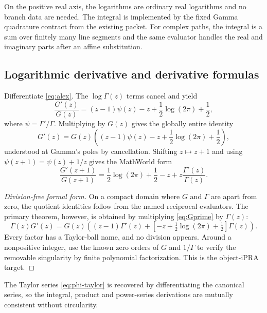 On the positive real axis, the logarithms are ordinary real logarithms and no
branch data are needed.  The integral is implemented by the fixed Gamma
quadrature contract from the existing packet.  For complex paths, the integral
is a sum over finitely many line segments and the same evaluator handles the
real and imaginary parts after an affine substitution.

\subsection{Logarithmic derivative and derivative formulas}

Differentiate \cref{eq:alex}.  The \(\log\Gamma(z)\) terms cancel and yield
\begin{equation}\label{eq:phi-global}
 \frac{G'(z)}{G(z)}
 =(z-1)\psi(z)-z+\frac12\log(2\pi)+\frac12,
\end{equation}
where \(\psi=\Gamma'/\Gamma\).  Multiplying by \(G(z)\) gives the globally
entire identity
\begin{equation}\label{eq:Gprime}
 G'(z)=G(z)\left((z-1)\psi(z)-z+\frac12\log(2\pi)+\frac12\right),
\end{equation}
understood at Gamma's poles by cancellation.  Shifting \(z\mapsto z+1\) and
using \(\psi(z+1)=\psi(z)+1/z\) gives the MathWorld form
\begin{equation}\label{eq:phi-shift}
 \frac{G'(z+1)}{G(z+1)}
 =\frac12\log(2\pi)+\frac12-z+z\frac{\Gamma'(z)}{\Gamma(z)}.
\end{equation}

\begin{proof}[Division-free formal form]
On a compact domain where \(G\) and \(\Gamma\) are apart from zero, the quotient
identities follow from the named reciprocal evaluators.  The primary theorem,
however, is obtained by multiplying \cref{eq:Gprime} by \(\Gamma(z)\):
\[
 \Gamma(z)G'(z)
 =G(z)\left((z-1)\Gamma'(z)
 +\left[-z+\tfrac12\log(2\pi)+\tfrac12\right]\Gamma(z)\right).
\]
Every factor has a Taylor-ball name, and no division appears.  Around a
nonpositive integer, use the known zero orders of \(G\) and \(1/\Gamma\) to
verify the removable singularity by finite polynomial factorization.  This is
the object-iPRA target.
\end{proof}

The Taylor series \cref{eq:phi-taylor} is recovered by differentiating the
canonical series, so the integral, product and power-series derivations are
mutually consistent without circularity.

